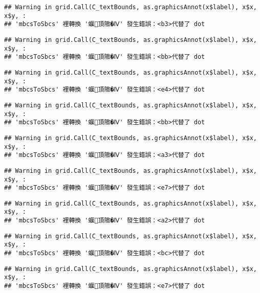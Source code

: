 \documentclass[
]{article}
\begin{document}
\begin{verbatim}
## Warning in grid.Call(C_textBounds, as.graphicsAnnot(x$label), x$x, x$y, :
## 'mbcsToSbcs' 裡轉換 '蝘頂隞�Ⅳ' 發生錯誤：<b3>代替了 dot
\end{verbatim}

\begin{verbatim}
## Warning in grid.Call(C_textBounds, as.graphicsAnnot(x$label), x$x, x$y, :
## 'mbcsToSbcs' 裡轉換 '蝘頂隞�Ⅳ' 發生錯誤：<bb>代替了 dot
\end{verbatim}

\begin{verbatim}
## Warning in grid.Call(C_textBounds, as.graphicsAnnot(x$label), x$x, x$y, :
## 'mbcsToSbcs' 裡轉換 '蝘頂隞�Ⅳ' 發生錯誤：<e4>代替了 dot
\end{verbatim}

\begin{verbatim}
## Warning in grid.Call(C_textBounds, as.graphicsAnnot(x$label), x$x, x$y, :
## 'mbcsToSbcs' 裡轉換 '蝘頂隞�Ⅳ' 發生錯誤：<bb>代替了 dot
\end{verbatim}

\begin{verbatim}
## Warning in grid.Call(C_textBounds, as.graphicsAnnot(x$label), x$x, x$y, :
## 'mbcsToSbcs' 裡轉換 '蝘頂隞�Ⅳ' 發生錯誤：<a3>代替了 dot
\end{verbatim}

\begin{verbatim}
## Warning in grid.Call(C_textBounds, as.graphicsAnnot(x$label), x$x, x$y, :
## 'mbcsToSbcs' 裡轉換 '蝘頂隞�Ⅳ' 發生錯誤：<e7>代替了 dot
\end{verbatim}

\begin{verbatim}
## Warning in grid.Call(C_textBounds, as.graphicsAnnot(x$label), x$x, x$y, :
## 'mbcsToSbcs' 裡轉換 '蝘頂隞�Ⅳ' 發生錯誤：<a2>代替了 dot
\end{verbatim}

\begin{verbatim}
## Warning in grid.Call(C_textBounds, as.graphicsAnnot(x$label), x$x, x$y, :
## 'mbcsToSbcs' 裡轉換 '蝘頂隞�Ⅳ' 發生錯誤：<bc>代替了 dot
\end{verbatim}

\begin{verbatim}
## Warning in grid.Call(C_textBounds, as.graphicsAnnot(x$label), x$x, x$y, :
## 'mbcsToSbcs' 裡轉換 '蝘頂隞�Ⅳ' 發生錯誤：<e7>代替了 dot
\end{verbatim}
\end{document}
